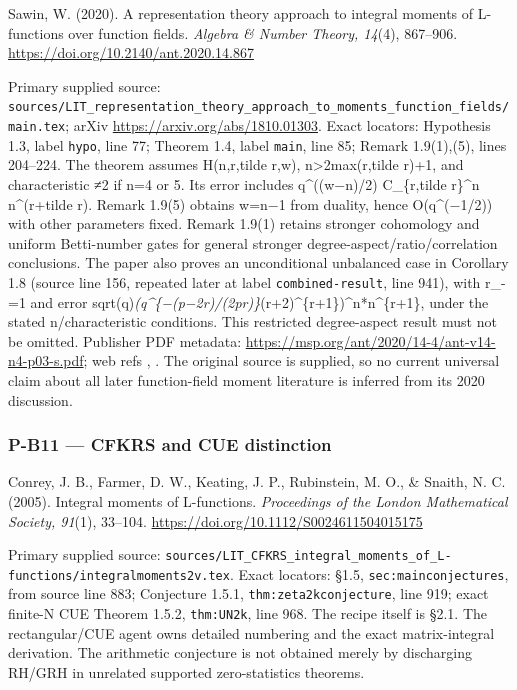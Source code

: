 \documentclass[11pt,a4paper]{article}
\theoremstyle{definition}\newtheorem{definition}{Definition}
\begin{document}
Sawin, W. (2020). A representation theory approach to integral moments
of L-functions over function fields. \emph{Algebra \& Number Theory,
14}(4), 867--906. \url{https://doi.org/10.2140/ant.2020.14.867}

Primary supplied source:
\nolinkurl{sources/LIT_representation_theory_approach_to_moments_function_fields/main.tex};
arXiv \url{https://arxiv.org/abs/1810.01303}. Exact locators: Hypothesis
1.3, label \nolinkurl{hypo}, line 77; Theorem 1.4, label \nolinkurl{main},
line 85; Remark 1.9(1),(5), lines 204--224. The theorem assumes
H(n,r,tilde r,w), n\textgreater2max(r,tilde r)+1, and characteristic ≠2
if n=4 or 5. Its error includes q\^{}((w−n)/2) C\_\{r,tilde r\}\^{}n
n\^{}(r+tilde r). Remark 1.9(5) obtains w=n−1 from duality, hence
O(q\^{}(−1/2)) with other parameters fixed. Remark 1.9(1) retains
stronger cohomology and uniform Betti-number gates for general stronger
degree-aspect/ratio/correlation conclusions. The paper also proves an
unconditional unbalanced case in Corollary 1.8 (source line 156,
repeated later at label \nolinkurl{combined-result}, line 941), with r\_-=1
and error
sqrt(q)\emph{(q\^{}\{−(p−2r)/(2pr)\}}(r+2)\^{}\{r+1\})\^{}n*n\^{}\{r+1\},
under the stated n/characteristic conditions. This restricted
degree-aspect result must not be omitted. Publisher PDF metadata:
\url{https://msp.org/ant/2020/14-4/ant-v14-n4-p03-s.pdf}; web refs , .
The original source is supplied, so no current universal claim about all
later function-field moment literature is inferred from its 2020
discussion.

\subsubsection{P-B11 --- CFKRS and CUE
distinction}\label{p-b11--cfkrs-and-cue-distinction}

Conrey, J. B., Farmer, D. W., Keating, J. P., Rubinstein, M. O., \&
Snaith, N. C. (2005). Integral moments of L-functions. \emph{Proceedings
of the London Mathematical Society, 91}(1), 33--104.
\url{https://doi.org/10.1112/S0024611504015175}

Primary supplied source:
\nolinkurl{sources/LIT_CFKRS_integral_moments_of_L-functions/integralmoments2v.tex}.
Exact locators: §1.5, \nolinkurl{sec:mainconjectures}, from source line
883; Conjecture 1.5.1, \nolinkurl{thm:zeta2kconjecture}, line 919; exact
finite-N CUE Theorem 1.5.2, \nolinkurl{thm:UN2k}, line 968. The recipe
itself is §2.1. The rectangular/CUE agent owns detailed numbering and
the exact matrix-integral derivation. The arithmetic conjecture is not
obtained merely by discharging RH/GRH in unrelated supported
zero-statistics theorems.
\end{document}
